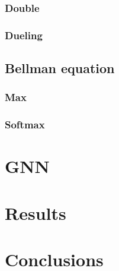 \documentclass[a4paper,10pt]{report}
\begin{document}
\subsection{Double}
\subsection{Dueling}
\section{Bellman equation}
\subsection{Max}
\subsection{Softmax}

\chapter{GNN}

\chapter{Results}



\chapter{Conclusions}

\printbibliography
\end{document}
